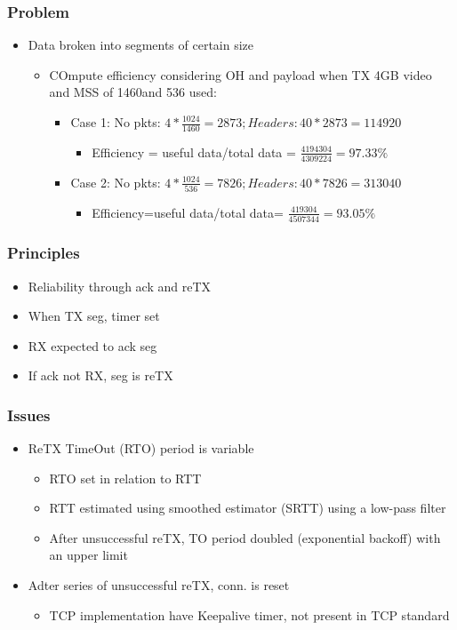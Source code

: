 \subsubsection{Problem}
\begin{itemize}
	\item Data broken into segments of certain size
	\begin{itemize}
		\item COmpute efficiency considering OH and payload when TX 4GB
			video and MSS of 1460and 536 used:
		\begin{itemize}
			\item Case 1: No pkts: $4*\frac{1024}{1460}=2873;
				Headers: 40*2873=114920$
			\begin{itemize}
				\item Efficiency = useful data/total data =
					$\frac{4194304}{4309224}=97.33\%$
			\end{itemize}
			\item Case 2: No pkts: $4*\frac{1024}{536}=7826;
				Headers: 40*7826=313040$
			\begin{itemize}
				\item Efficiency=useful data/total data=
					$\frac{419304}{4507344}=93.05\% $
			\end{itemize}
		\end{itemize}
	\end{itemize}
\end{itemize}
\subsubsection{Principles}
\begin{itemize}
	\item Reliability through ack and reTX
	\item When TX seg, timer set
	\item RX expected to ack seg
	\item If ack not RX, seg is reTX
\end{itemize}
\subsubsection{Issues}
\begin{itemize}
	\item ReTX TimeOut (RTO) period is variable
	\begin{itemize}
		\item RTO set in relation to RTT
		\item RTT estimated using smoothed estimator (SRTT) using a
			low-pass filter
		\item After unsuccessful reTX, TO period doubled (exponential
			backoff) with an upper limit
	\end{itemize}
	\item Adter series of unsuccessful reTX, conn. is reset
	\begin{itemize}
		\item TCP implementation have Keepalive timer, not present in
			TCP standard
	\end{itemize}
\end{itemize}
